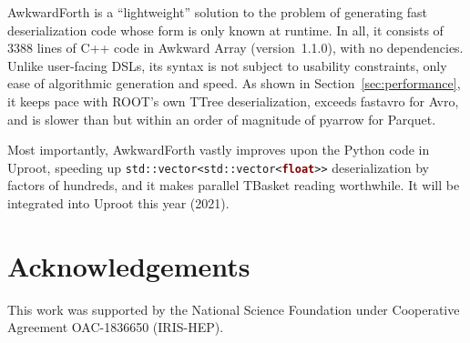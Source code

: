 \documentclass{webofc}
\begin{document}
AwkwardForth is a ``lightweight'' solution to the problem of generating fast deserialization code whose form is only known at runtime. In all, it consists of 3388 lines of C++ code in Awkward Array (version~1.1.0), with no dependencies. Unlike user-facing DSLs, its syntax is not subject to usability constraints, only ease of algorithmic generation and speed. As shown in Section~\ref{sec:performance}, it keeps pace with ROOT's own TTree deserialization, exceeds fastavro for Avro, and is slower than but within an order of magnitude of pyarrow for Parquet.

Most importantly, AwkwardForth vastly improves upon the Python code in Uproot, speeding up {\tt std::vector<std::vector<\textcolor{Maroon}{\textbf{float}}>{}>} deserialization by factors of hundreds, and it makes parallel TBasket reading worthwhile. It will be integrated into Uproot this year (2021).

\section{Acknowledgements}

This work was supported by the National Science Foundation under Cooperative Agreement OAC-1836650 (IRIS-HEP).






\end{document}
